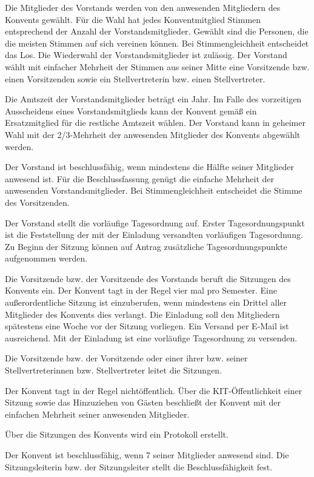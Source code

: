 \documentclass[a4paper, parskip=half, numbers=noenddot]{scrartcl}
\begin{document}
\begin{contract}
\label{wahl}
Die Mitglieder des Vorstands werden von den anwesenden Mitgliedern des Konvents gewählt. Für
die Wahl hat jedes Konventmitglied Stimmen entsprechend der Anzahl der Vorstandsmitglieder. 
Gewählt sind die Personen, die die meisten Stimmen auf sich vereinen können. Bei Stimmengleichheit entscheidet das Los. Die Wiederwahl der Vorstandsmitglieder ist zulässig.
Der Vorstand wählt mit einfacher Mehrheit der Stimmen aus seiner Mitte eine Vorsitzende bzw.
einen Vorsitzenden sowie ein Stellvertreterin bzw. einen Stellvertreter.

Die Amtszeit der Vorstandsmitglieder beträgt ein Jahr. Im Falle des vorzeitigen Ausscheidens
eines Vorstandsmitglieds kann der Konvent gemäß  ein Ersatzmitglied für die restliche Amtszeit wählen. Der Vorstand kann in geheimer Wahl mit der 2/3-Mehrheit der anwesenden Mitglieder des Konvents abgewählt werden.

Der Vorstand ist beschlussfähig, wenn mindestens die Hälfte seiner Mitglieder anwesend ist. Für die Beschlussfassung genügt die einfache Mehrheit der anwesenden Vorstandsmitglieder. Bei Stimmengleichheit entscheidet die Stimme des Vorsitzenden.


Der Vorstand stellt die vorläufige Tagesordnung auf. Erster Tagesordnungspunkt ist die Feststellung der mit der Einladung versandten vorläufigen Tagesordnung. Zu Beginn der Sitzung können auf Antrag zusätzliche Tagesordnungspunkte aufgenommen werden.

Die Vorsitzende bzw. der Vorsitzende des Vorstands beruft die Sitzungen des Konvents ein.
Der Konvent tagt in der Regel vier mal pro Semester. Eine außerordentliche Sitzung ist einzuberufen, wenn mindestens ein Drittel aller Mitglieder des Konvents dies verlangt. Die Einladung soll den Mitgliedern spätestens eine Woche vor der Sitzung vorliegen. Ein Versand per E-Mail ist ausreichend. Mit der Einladung ist eine vorläufige Tagesordnung zu versenden.

Die Vorsitzende bzw. der Vorsitzende oder einer ihrer bzw. seiner Stellvertreterinnen bzw. Stellvertreter leitet die Sitzungen.	

Der Konvent tagt in der Regel nichtöffentlich. Über die KIT-Öffentlichkeit einer Sitzung sowie das Hinzuziehen von Gästen beschließt der Konvent mit der einfachen Mehrheit seiner anwesenden Mitglieder.

Über die Sitzungen des Konvents wird ein Protokoll erstellt.

Der Konvent ist beschlussfähig, wenn 7 seiner Mitglieder anwesend sind. Die Sitzungsleiterin bzw. der Sitzungsleiter stellt die Beschlussfähigkeit fest.	


\end{contract}
\end{document}
